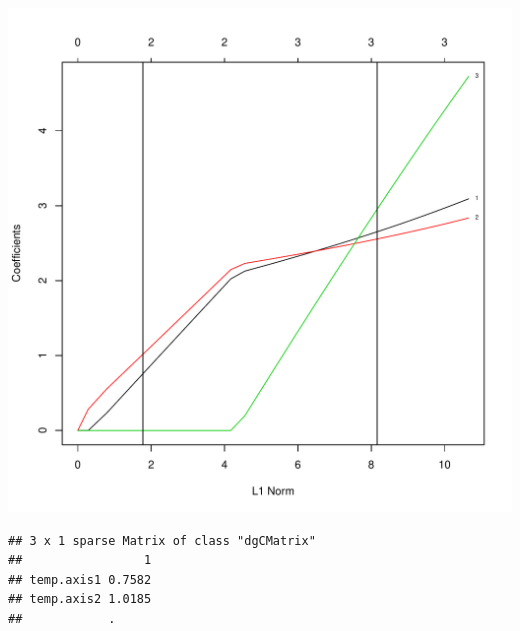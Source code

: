\documentclass{article}
\begin{document}
\begin{knitrout}
\begin{kframe}\begin{alltt}
\hlopt{$}  \hlstd{=} \hlstd{)}
\hlstd{(} \hlstd{=} \hlstd{(}\hlstd{(}\hlopt{$}  \hlopt{$}
\hlstd{(} \hlstd{=} \hlstd{(}\hlstd{(}\hlopt{$}  \hlopt{$}
\end{alltt}
\end{kframe}

{\centering \includegraphics[width=\maxwidth]{figure/metagene-pairs-12} 

}


\begin{kframe}\begin{alltt}
\hlopt{$}  \hlopt{$}
\end{alltt}
\begin{verbatim}
## 3 x 1 sparse Matrix of class "dgCMatrix"
##                 1
## temp.axis1 0.7582
## temp.axis2 1.0185
##            .
\end{verbatim}
\end{kframe}
\end{knitrout}
\end{document}
